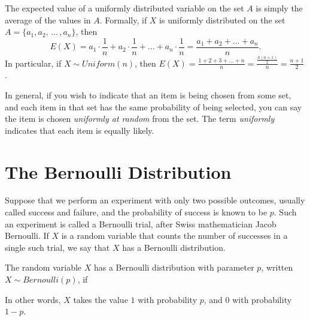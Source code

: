 \begin{center}
\end{center}

The expected value of a uniformly distributed variable on the set $A$ is simply the average of the values in $A$. Formally, if $X$ is uniformly distributed on the set $A = \{a_1, a_2,\, ... \, , a_n\}$, then
$$E(X) = a_1 \cdot \textstyle\frac{1}{n} + a_2 \cdot \frac{1}{n} + ... + a_n \cdot \frac{1}{n} = \frac{a_1 + a_2 + ... + a_n}{n}.$$
In particular, if $X \sim Uniform(n)$, then $E(X) = \frac{1+2+3+...+n}{n} = \frac{\frac{n(n+1)}{2}}{n} = \frac{n+1}{2}$.
\par
\rmk In general, if you wish to indicate that an item is being chosen from some set, and each item in that set has the same probability of being selected, you can say the item is chosen \emph{uniformly at random} from the set. The term \emph{uniformly} indicates that each item is equally likely.

\section{The Bernoulli Distribution}\label{BernoulliDist}

Suppose that we perform an experiment with only two possible outcomes, usually called success and failure, and the probability of success is known to be $p$. Such an experiment is called a Bernoulli trial, after Swiss mathematician Jacob Bernoulli. If $X$ is a random variable that counts the number of successes in a single such trial, we say that $X$ has a Bernoulli distribution.

\begin{defn}The random variable $X$ has a Bernoulli distribution with parameter $p$, written $X \sim Bernoulli(p)$, if
\renewcommand*{\arraystretch}{1.35}
\renewcommand*{\arraystretch}{1}
\par
\noindent In other words, $X$ takes the value $1$ with probability $p$, and $0$ with probability $1-p$.
\end{defn}

